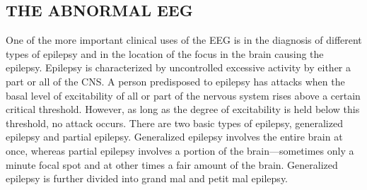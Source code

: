 \subsection{THE ABNORMAL EEG}

One of the more important clinical uses of the EEG is in the diagnosis of
different types of epilepsy and in the location of the focus in the brain causing
the epilepsy. Epilepsy is characterized by uncontrolled excessive activity by
either a part or all of the CNS. A person predisposed to epilepsy has attacks
when the basal level of excitability of all or part of the nervous system rises
above a certain critical threshold. However, as long as the degree of excitability
is held below this threshold, no attack occurs.
There are two basic types of epilepsy, generalized epilepsy and partial
epilepsy. Generalized epilepsy involves the entire brain at once, whereas
partial epilepsy involves a portion of the brain—sometimes only a minute
focal spot and at other times a fair amount of the brain. Generalized epilepsy is
further divided into grand mal and petit mal epilepsy.

